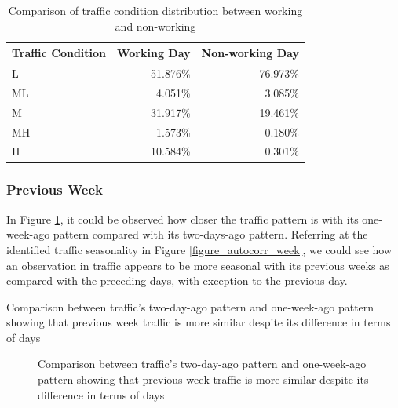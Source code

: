 \begin{table}[h]
\centering
\caption{Comparison of traffic condition distribution between working and non-working}
\label{table_traffic_cond_workingday}
\begin{tabular}{|l|r|r|}
\hline
\textbf{Traffic Condition} & \textbf{Working Day} & \textbf{Non-working Day} \\ \hline
L                          & 51.876\%             & 76.973\%                 \\ \hline
ML                         & 4.051\%              & 3.085\%                  \\ \hline
M                          & 31.917\%             & 19.461\%                 \\ \hline
MH                         & 1.573\%              & 0.180\%                  \\ \hline
H                          & 10.584\%             & 0.301\%                  \\ \hline
\end{tabular}
\end{table}






\subsubsection{Previous Week}
In Figure \ref{figure_traffic_day_vs_week}, it could be observed how closer the traffic pattern is with its one-week-ago pattern compared with its two-days-ago pattern. Referring at the identified traffic seasonality in Figure \ref{figure_autocorr_week}, we could see how an observation in traffic appears to be more seasonal with its previous weeks as compared with the preceding days, with exception to the previous day.


Comparison between traffic’s two-day-ago pattern and one-week-ago pattern showing that previous week traffic is more similar despite its difference in terms of days

\begin{figure}[h]
  \centering
  \captionsetup{justification=centering}
  \caption{Comparison between traffic’s two-day-ago pattern and one-week-ago pattern showing that previous week traffic is more similar despite its difference in terms of days}
  \label{figure_traffic_day_vs_week}
\end{figure}



